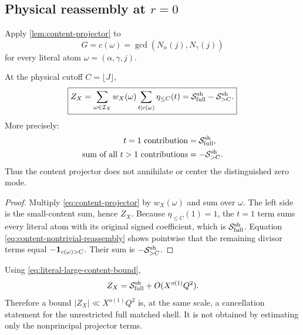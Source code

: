 \subsection{\texorpdfstring{Physical reassembly at \(r=0\)}
{Physical reassembly at r=0}}

Apply \cref{lem:content-projector} to
\[
 G=c(\omega)
 =\gcd(N_\alpha(j),N_\gamma(j))
\]
for every literal atom \(\omega=(\alpha,\gamma,j)\).

\begin{theorem}
\label{thm:content-no-centering}
At the physical cutoff \(C=\lfloor J\rfloor\),
\begin{equation}
 \boxed{
 Z_X
 =\sum_{\omega\in\mathcal I_X}w_X(\omega)
  \sum_{t\mid c(\omega)}\eta_{\le C}(t)
 =\mathcal S_{\rm full}^{\rm sh}-\mathcal S_{>C}^{\rm sh}.}
 \label{eq:content-physical-reassembly}
\end{equation}
More precisely:
\begin{align}
 \text{\(t=1\) contribution}
 &=\mathcal S_{\rm full}^{\rm sh},
 \label{eq:content-t-one}\\
 \text{sum of all \(t>1\) contributions}
 &=-\mathcal S_{>C}^{\rm sh}.
 \label{eq:content-t-greater-one}
\end{align}
Thus the content projector does not annihilate or center the
distinguished zero mode.
\end{theorem}

\begin{proof}
Multiply \eqref{eq:content-projector} by \(w_X(\omega)\) and sum over
\(\omega\).  The left side is the small-content sum, hence \(Z_X\).
Because \(\eta_{\le C}(1)=1\), the \(t=1\) term sums every literal atom
with its original signed coefficient, which is
\(\mathcal S_{\rm full}^{\rm sh}\).  Equation
\eqref{eq:content-nontrivial-reassembly} shows pointwise that the
remaining divisor terms equal \(-\mathbf 1_{c(\omega)>C}\).  Their sum is
\(-\mathcal S_{>C}^{\rm sh}\).
\end{proof}

\begin{corollary}
\label{cor:content-hard-principal}
Using \eqref{eq:literal-large-content-bound},
\begin{equation}
 Z_X
 =\mathcal S_{\rm full}^{\rm sh}+O(X^{o(1)}Q^2).
 \label{eq:content-full-mod-error}
\end{equation}
Therefore a bound
\(|Z_X|\ll X^{o(1)}Q^2\) is, at the same scale, a cancellation
statement for the unrestricted full matched shell.  It is not
obtained by estimating only the nonprincipal projector terms.
\end{corollary}

